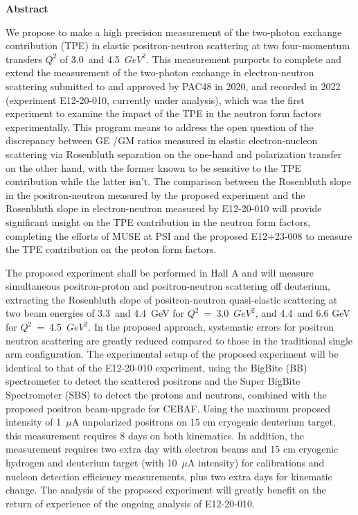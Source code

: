 \begin{center}
{{\large {\bf Abstract}}} 
\end{center}


We propose to make a high precision measurement of the two-photon exchange contribution (TPE) in elastic positron-neutron scattering at two four-momentum transfers $Q^2$ of 3.0~and 4.5~$GeV^2$. This measurement purports to complete and extend the measurement of the two-photon exchange in electron-neutron scattering submitted to and approved by PAC48 in 2020, and recorded in 2022 (experiment E12-20-010, currently under analysis), which was the first experiment to examine the impact of the TPE in the neutron form factors experimentally. This program means to address the open question of the discrepancy between GE /GM ratios measured in elastic electron-nucleon scattering via Rosenbluth separation on the one-hand and polarization transfer on the other hand, with the former known to be sensitive to the TPE contribution while the latter isn’t.
The comparison between the Rosenbluth slope in the positron-neutron measured by the proposed experiment and the Rosenbluth slope in electron-neutron measured by E12-20-010 will provide significant insight on the TPE contribution in the neutron form factors, completing the efforts of MUSE at PSI and the proposed E12+23-008 to measure the TPE contribution on the proton form factors.

The proposed experiment shall be performed in Hall A and will measure simultaneous positron-proton and positron-neutron scattering off deuterium, extracting the Rosenbluth slope of positron-neutron quasi-elastic scattering at two beam energies of 3.3~and 4.4~GeV for $Q^2$~=~3.0~$GeV^2$, and 4.4~and 6.6 GeV for $Q^2$~=~4.5~$GeV^2$. In the proposed approach, systematic errors for positron neutron scattering are greatly reduced compared to those in the traditional single arm configuration.
The experimental setup of the proposed experiment will be identical to that of the E12-20-010 experiment, using the BigBite (BB) spectrometer to detect the scattered positrons and the Super BigBite Spectrometer (SBS) to detect the protons and neutrons, combined with the proposed positron beam-upgrade for CEBAF. Using the maximum proposed intensity of 1~$\mu$A unpolarized positrons on 15 cm cryogenic deuterium target, this measurement requires 8 days on both kinematics.
In addition, the measurement requires two extra day with electron beams and 15 cm cryogenic hydrogen and deuterium target (with 10~$\mu$A intensity) for calibrations and nucleon detection efficiency measurements, plus two extra days for kinematic change. The analysis of the proposed experiment will greatly benefit on the return of experience of the ongoing analysis of E12-20-010.

